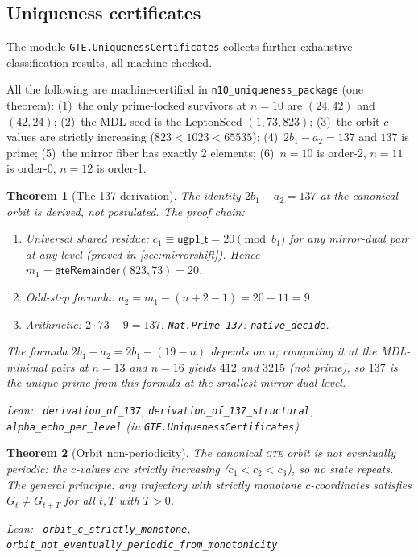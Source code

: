 \documentclass[11pt,a4paper]{article}
\newenvironment{leanref}%
  {\par\smallskip\noindent\begingroup\raggedright\textup{Lean:}~}%
  {\par\endgroup}
\newenvironment{keybox}[1]{%
  \Needspace*{8\baselineskip}%
  \begin{tcolorbox}[
    enhanced,
    breakable=false,
    colback=blue!5,
    colframe=blue!45!black,
    coltitle=black,
    colbacktitle=blue!14,
    boxrule=0.85pt,
    arc=2.5pt,
    left=9pt, right=9pt, top=6pt, bottom=6pt,
    titlerule=0.55pt,
    fonttitle=\bfseries,
    title={#1},
    before upper=\raggedright,
    before skip=0.9\baselineskip,
    after skip=0.9\baselineskip
  ]%
}{%
  \end{tcolorbox}%
}
\newtheorem{theorem}{Theorem}[section]
\theoremstyle{definition}
\newcommand{\gte}{\textsc{gte}}
\begin{document}
\subsection{Uniqueness certificates}\label{sec:uniqueness}

The module \texttt{GTE.UniquenessCertificates} collects further exhaustive
classification results, all machine-checked.

\begin{keybox}{The n=10 Uniqueness Package}
All the following are machine-certified in \lstinline|n10_uniqueness_package| (one theorem):
(1)~the only prime-locked survivors at $n=10$ are $(24,42)$ and $(42,24)$;
(2)~the MDL seed is the LeptonSeed $(1,73,823)$;
(3)~the orbit $c$-values are strictly increasing ($823 < 1023 < 65535$);
(4)~$2 b_1 - a_2 = 137$ and $137$ is prime;
(5)~the mirror fiber has exactly 2 elements;
(6)~$n=10$ is order-2, $n=11$ is order-0, $n=12$ is order-1.
\end{keybox}

\begin{theorem}[The 137 derivation]\label{thm:137}
The identity $2 b_1 - a_2 = 137$ at the canonical orbit is \emph{derived}, not
postulated.  The proof chain:
\begin{enumerate}[nosep]
\item Universal shared residue: $c_1 \equiv \mathsf{ugp1\_t} = 20 \pmod{b_1}$
  for any mirror-dual pair at any level (proved in \cref{sec:mirrorshift}).
  Hence $m_1 = \mathsf{gteRemainder}(823, 73) = 20$.
\item Odd-step formula: $a_2 = m_1 - (n+2-1) = 20 - 11 = 9$.
\item Arithmetic: $2 \cdot 73 - 9 = 137$.  \lstinline|Nat.Prime 137|: \lstinline|native_decide|.
\end{enumerate}
The formula $2 b_1 - a_2 = 2b_1 - (19-n)$ depends on $n$; computing it at
the MDL-minimal pairs at $n=13$ and $n=16$ yields $412$ and $3215$ (not prime),
so $137$ is the unique prime from this formula at the smallest mirror-dual level.

\begin{leanref} \lstinline|derivation_of_137|,
\lstinline|derivation_of_137_structural|,
\lstinline|alpha_echo_per_level|
\textup{(in \texttt{GTE.UniquenessCertificates})}
\end{leanref}
\end{theorem}

\begin{theorem}[Orbit non-periodicity]\label{thm:non-periodic}
The canonical \gte{} orbit is not eventually periodic: the $c$-values are
strictly increasing ($c_1 < c_2 < c_3$), so no state repeats.  The general
principle: any trajectory with strictly monotone $c$-coordinates satisfies
$G_t \ne G_{t+T}$ for all $t, T$ with $T > 0$.

\begin{leanref} \lstinline|orbit_c_strictly_monotone|,
\lstinline|orbit_not_eventually_periodic_from_monotonicity|
\end{leanref}
\end{theorem}
\end{document}
